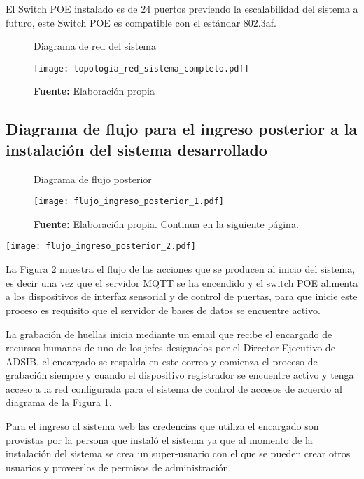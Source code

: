 \documentclass[../principal]{subfiles}
\begin{document}
  El Switch POE instalado es de 24 puertos previendo la escalabilidad del sistema a futuro, este Switch POE es compatible con el estándar 802.3af.

  \begin{figure}[H]
    \centering
    \caption{Diagrama de red del sistema}
    \texttt{[image: topologia\_red\_sistema\_completo.pdf]}
    \caption*{\textbf{Fuente:} Elaboración propia}
    \label{fig:topologia_red_sistema_completo}
  \end{figure}  

  \begin{landscape}
    \subsection{Diagrama de flujo para el ingreso posterior a la instalación del sistema desarrollado}

    \begin{figure}[H]
      \centering
      \caption{Diagrama de flujo posterior}
      \texttt{[image: flujo\_ingreso\_posterior\_1.pdf]}
      \caption*{\textbf{Fuente:} Elaboración propia. Continua en la siguiente página.}
      \label{fig:flujo_ingreso_posterior}
    \end{figure}  

    \clearpage
    \texttt{[image: flujo\_ingreso\_posterior\_2.pdf]}
    \clearpage
  \end{landscape}

  La Figura \ref{fig:flujo_ingreso_posterior} muestra el flujo de las acciones que se producen al inicio del sistema, es decir una vez que el servidor MQTT se ha encendido y el switch POE alimenta a los dispositivos de interfaz sensorial y de control de puertas, para que inicie este proceso es requisito que el servidor de bases de datos se encuentre activo.

  La grabación de huellas inicia mediante un email que recibe el encargado de recursos humanos de uno de los jefes designados por el Director Ejecutivo de ADSIB, el encargado se respalda en este correo y comienza el proceso de grabación siempre y cuando el dispositivo registrador se encuentre activo y tenga acceso a la red configurada para el sistema de control de accesos de acuerdo al diagrama de la Figura \ref{fig:topologia_red_sistema_completo}. 

  Para el ingreso al sistema web las credencias que utiliza el encargado son provistas por la persona que instaló el sistema ya que al momento de la instalación del sistema se crea un super-usuario con el que se pueden crear otros usuarios y proveerlos de permisos de administración.
\end{document}
